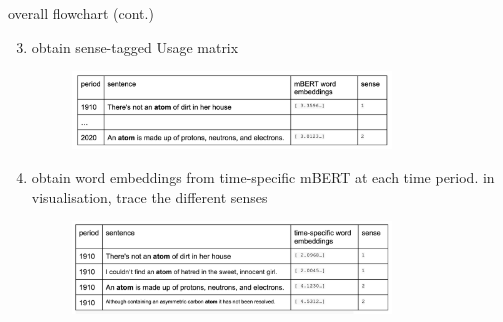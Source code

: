 \documentclass[10pt]{beamer}
\begin{document}
\begin{frame}{overall flowchart (cont.)}
\begin{enumerate}
    \setcounter{enumi}{2}
  \item obtain sense-tagged Usage matrix 
    \begin{figure}
    \centering
    \includegraphics[width=0.8\textwidth]{step3.png}
  \end{figure} 
  \item obtain word embeddings from time-specific mBERT at each time period. in visualisation, trace the different senses
    \begin{figure}
    \centering
    \includegraphics[width=0.8\textwidth]{step4.png}
  \end{figure} 
\end{enumerate}
\end{frame}
\end{document}
